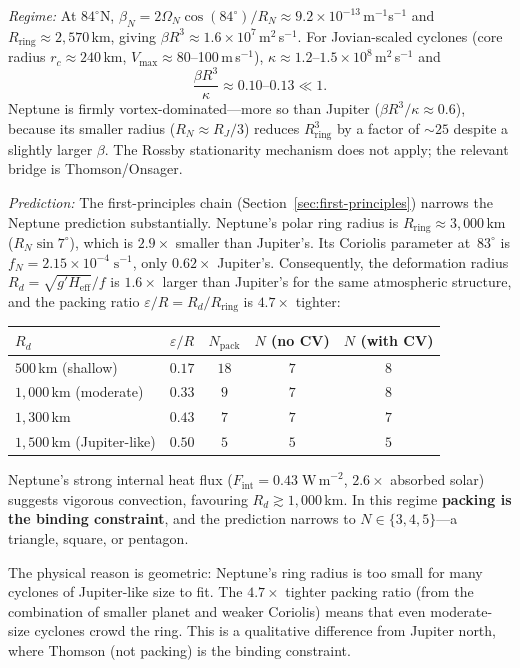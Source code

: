 \textit{Regime:}
At $84^\circ$N, $\beta_N = 2\Omega_N\cos(84^\circ)/R_N \approx
9.2\times10^{-13}$\,m$^{-1}$s$^{-1}$ and $R_{\mathrm{ring}} \approx
2{,}570$\,km, giving $\beta R^3 \approx 1.6\times10^7$\,m$^2$\,s$^{-1}$.
For Jovian-scaled cyclones (core radius $r_c \approx 240$\,km,
$V_{\max}\approx 80$--100\,m\,s$^{-1}$), $\kappa \approx
1.2\text{--}1.5\times10^8$\,m$^2$\,s$^{-1}$ and
\[
  \frac{\beta R^3}{\kappa}\approx 0.10\text{--}0.13 \ll 1.
\]
Neptune is firmly vortex-dominated---more so than Jupiter ($\beta
R^3/\kappa \approx 0.6$), because its smaller radius ($R_N \approx
R_J/3$) reduces $R_{\mathrm{ring}}^3$ by a factor of $\sim\!25$
despite a slightly larger $\beta$.  The Rossby stationarity mechanism
does not apply; the relevant bridge is Thomson/Onsager.

\textit{Prediction:}
The first-principles chain (Section~\ref{sec:first-principles})
narrows the Neptune prediction substantially.  Neptune's polar
ring radius is $R_{\mathrm{ring}} \approx 3{,}000$\,km
($R_N \sin 7^\circ$), which is $2.9\times$ smaller than Jupiter's.
Its Coriolis parameter at~$83^\circ$ is $f_N = 2.15\times
10^{-4}\;\mathrm{s}^{-1}$, only $0.62\times$ Jupiter's.
Consequently, the deformation radius
$R_d = \sqrt{g' H_{\mathrm{eff}}}/f$ is $1.6\times$ larger than
Jupiter's for the same atmospheric structure, and the packing ratio
$\varepsilon/R = R_d/R_{\mathrm{ring}}$ is $4.7\times$ tighter:
\begin{center}
\begin{tabular}{lcccc}
\toprule
$R_d$ & $\varepsilon/R$ & $N_{\mathrm{pack}}$ &
$N$ (no CV) & $N$ (with CV) \\
\midrule
$500$\,km (shallow) & $0.17$ & $18$ & $7$ & $8$ \\
$1{,}000$\,km (moderate) & $0.33$ & $9$ & $7$ & $8$ \\
$1{,}300$\,km & $0.43$ & $7$ & $7$ & $7$ \\
$1{,}500$\,km (Jupiter-like) & $0.50$ & $5$ & $5$ & $5$ \\
\bottomrule
\end{tabular}
\end{center}
Neptune's strong internal heat flux ($F_{\mathrm{int}} = 0.43\;
\mathrm{W\,m}^{-2}$, $2.6\times$ absorbed solar) suggests vigorous
convection, favouring $R_d \gtrsim 1{,}000$\,km.  In this regime
\textbf{packing is the binding constraint}, and the prediction
narrows to $N \in \{3, 4, 5\}$---a triangle, square, or pentagon.

The physical reason is geometric: Neptune's ring radius is too small
for many cyclones of Jupiter-like size to fit.  The $4.7\times$
tighter packing ratio (from the combination of smaller planet and
weaker Coriolis) means that even moderate-size cyclones crowd the
ring.  This is a qualitative difference from Jupiter north, where
Thomson (not packing) is the binding constraint.

